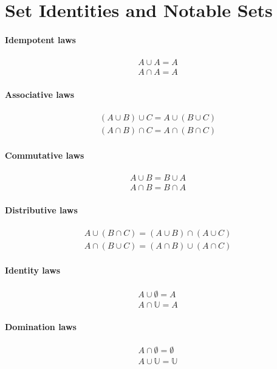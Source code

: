 \documentclass[a4paper]{article}
\begin{document}
  \section{Set Identities and Notable Sets}
\paragraph{Idempotent laws}
\begin{align*}
  A \cup A  =  A \\
  A \cap A  =  A
\end{align*}
\paragraph{Associative laws}
\begin{align*}
  (A \cup B) \cup C  =  A \cup (B \cup C) \\
  (A \cap B) \cap C  =  A \cap (B \cap C)
\end{align*}
\paragraph{Commutative laws}
\begin{align*}
  A \cup B  =  B \cup A \\
  A \cap B  =  B \cap A
\end{align*}
\paragraph{Distributive laws}
\begin{align*}
  A \cup (B \cap C)  =  (A \cup B) \cap (A \cup C) \\
  A \cap (B \cup C)  =  (A \cap B) \cup (A \cap C)
\end{align*}
\paragraph{Identity laws}
\begin{align*}
  A \cup \emptyset  =  A \\
A \cap \mathbb U  =  A
\end{align*}
\paragraph{Domination laws}
\begin{align*}
  A \cap \emptyset  =  \emptyset \\
  A \cup \mathbb U  =  \mathbb U
\end{align*}
\end{document}
